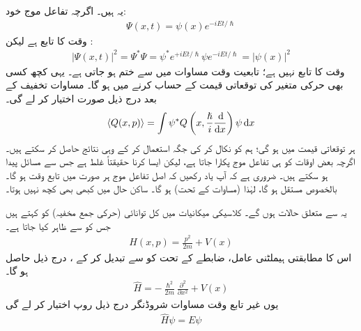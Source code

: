 \quad 
یہ  ہیں۔ اگرچہ تفاعل موج خود:
\begin{align}\label{مساوات_شروڈنگر_غیر_تابع_اور_تابع}
\Psi (x,t) = \psi (x) e^{-iEt/\hslash}
\end{align}
وقت  کا تابع ہے لیکن :
\begin{align}
\left| \Psi (x,t) \right|^{2} = \Psi^{*}\Psi = \psi^{*}e^{+iEt/\hslash} \psi e^{-iEt/\hslash} = \left| \psi (x) \right|^{2}
\end{align}
وقت کا تابع نہیں ہے؛ تابعیت وقت مساوات میں سے ختم ہو جاتی ہے۔ یہی کچھ کسی بھی حرکی متغیر کی توقعاتی قیمت کے حساب کرنے میں ہو گا۔ مساوات  تخفیف کے بعد درج ذیل صورت اختیار کر لے گی۔ 
\begin{align}\label{مساوات_غیر_تابع_وقت_توقعاتی_قیمت}
\langle Q(x,p) \rangle = \int \psi^{*} Q \left( x, \frac{\hslash}{i} \frac{\dif}{\dif x} \right) \psi \dif x
\end{align}
ہر توقعاتی قیمت  میں  ہو گی؛ ہم  کو نکال کر  کی جگہ  استعمال کر کے وہی نتائج حاصل کر سکتے ہیں۔ اگرچہ بعض اوقات  کو ہی تفاعل موج پکارا جاتا ہے، لیکن ایسا کرنا حقیقتاً غلط ہے جس سے مسائل پیدا ہو سکتے ہیں۔ ضروری ہے کہ آپ یاد رکھیں کہ اصل تفاعل موج ہر صورت میں تابع وقت ہو گا۔ بالخصوص  مستقل ہو گا، لہٰذا (مساوات  کے تحت)  ہو گا۔ ساکن حال میں کبھی بھی کچھ نہیں ہوتا۔ 

 \quad
یہ  سے متعلق حالات ہوں گے۔ کلاسیکی میکانیات میں کل توانائی (حرکی جمع مخفیہ) کو  کہتے ہیں جس کو  سے ظاہر کیا جاتا ہے۔ 
\begin{align}
H(x,p) = \frac{p^{2}}{2m} + V(x)
\end{align}
اس کا مطابقتی ہیملٹنی عامل، ضابطے کے تحت  کو  سے تبدیل 
کر کے ، درج ذیل حاصل ہو گا۔ 
\begin{align}
\hat{H} = - \frac{\hslash^{2}}{2m} \frac{\partial^{2}}{\partial x^{2}} + V(x) 
\end{align}
یوں غیر تابع وقت مساوات شروڈنگر  درج ذیل روپ اختیار کر لے گی 
\begin{align}\label{مساوات_غیر_تابع_شروڈنگر_توانائی_مساوات}
\hat{H} \psi = E\psi
\end{align}

